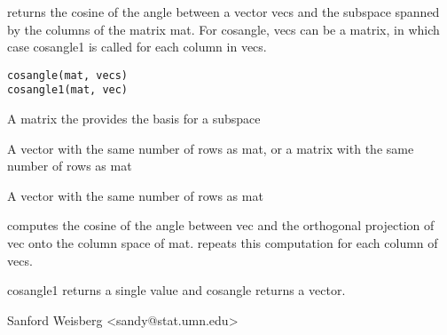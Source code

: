 \begin{Description}\relax
{} returns the cosine of the
angle between a vector vecs  and the subspace spanned
by the columns of the matrix mat.  For cosangle, vecs can be a matrix, in
which case cosangle1 is called for each column in vecs.
\end{Description}
\begin{Usage}
\begin{verbatim}
cosangle(mat, vecs)
cosangle1(mat, vec)
\end{verbatim}
\end{Usage}
\begin{Arguments}
\begin{ldescription}
\item[\code{mat}] A matrix the provides the basis for a subspace
\item[\code{vecs}] A vector with the same number of rows as mat, or a matrix
with the same number of rows as mat
\item[\code{vec}] A vector with the same number of rows as mat
\end{ldescription}
\end{Arguments}
\begin{Details}\relax
{} computes the cosine of the angle between vec and the orthogonal projection
of vec onto the column space of mat.   repeats this computation
for each column of vecs.
\end{Details}
\begin{Value}
cosangle1 returns a single value and cosangle returns a vector.
\end{Value}
\begin{Author}\relax
Sanford Weisberg <sandy@stat.umn.edu>
\end{Author}

